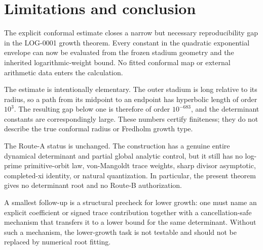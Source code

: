 \section{Limitations and conclusion}

The explicit conformal estimate closes a narrow but necessary reproducibility
gap in the LOG-0001 growth theorem.  Every constant in the quadratic
exponential envelope can now be evaluated from the frozen stadium geometry
and the inherited logarithmic-weight bound.  No fitted conformal map or
external arithmetic data enters the calculation.

The estimate is intentionally elementary.  The outer stadium is long
relative to its radius, so a path from its midpoint to an endpoint has
hyperbolic length of order \(10^3\).  The resulting gap below one is therefore
of order \(10^{-683}\), and the determinant constants are correspondingly
large.  These numbers certify finiteness; they do not describe the true
conformal radius or Fredholm growth type.

The Route-A status is unchanged.  The construction has a genuine entire
dynamical determinant and partial global analytic control, but it still has
no log-prime primitive-orbit law, von-Mangoldt trace weights, sharp divisor
asymptotic, completed-xi identity, or natural quantization.  In particular,
the present theorem gives no determinant root and no Route-B authorization.

A smallest follow-up is a structural precheck for lower growth: one must name
an explicit coefficient or signed trace contribution together with a
cancellation-safe mechanism that transfers it to a lower bound for the same
determinant.  Without such a mechanism, the lower-growth task is not testable
and should not be replaced by numerical root fitting.

